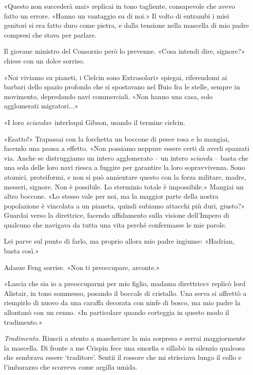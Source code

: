 «Questo non succederà mai» replicai in tono tagliente, consapevole che
avevo fatto un errore. «Hanno un vantaggio su di noi.» Il volto di
entrambi i miei genitori si era fatto duro come pietra, e dalla tensione
nella mascella di mio padre compresi che stava per parlare.

Il giovane ministro del Consorzio però lo prevenne. «Cosa intendi dire,
signore?» chiese con un dolce sorriso.

«Noi viviamo su pianeti, i Cielcin sono Extrasolari» spiegai,
riferendomi ai barbari dello spazio profondo che si spostavano nel Buio
fra le stelle, sempre in movimento, depredando navi commerciali. «Non
hanno una casa, solo agglomerati migratori...»

«I loro \emph{scianda}» interloquì Gibson, usando il termine cielcin.

«Esatto!» Trapassai con la forchetta un boccone di pesce rosa e lo
mangiai, facendo una pausa a effetto. «Non possiamo neppure essere certi
di averli spazzati via. Anche se distruggiamo un intero agglomerato --
un intero \emph{scianda} -- basta che una sola delle loro navi riesca a
fuggire per garantire la loro sopravvivenza. Sono atomici, proteiformi,
e non si può annientare questo con la forza militare, madre, messeri,
signore. Non è possibile. Lo sterminio totale è impossibile.» Mangiai un
altro boccone. «Lo stesso vale per noi, ma la maggior parte della nostra
popolazione è vincolata a un pianeta, quindi subiamo attacchi più duri,
giusto?» Guardai verso la direttrice, facendo affidamento sulla visione
dell'Impero di qualcuno che navigava da tutta una vita perché
confermasse le mie parole.

Lei parve sul punto di farlo, ma proprio allora mio padre ingiunse:
«Hadrian, basta così.»

Adaeze Feng sorrise. «Non ti preoccupare, arconte.»

«Lascia che sia io a preoccuparmi per mio figlio, madama direttrice»
replicò lord Alistair, in tono sommesso, posando il boccale di
cristallo. Una serva si affrettò a riempirlo di nuovo da una caraffa
decorata con ninfe di bosco, ma mio padre la allontanò con un cenno. «In
particolare quando corteggia in questo modo il tradimento.»

\emph{Tradimento}. Riuscii a stento a mascherare la mia sorpresa e
serrai maggiormente la mascella. Di fronte a me Crispin fece una smorfia
e sillabò in silenzio qualcosa che sembrava essere `traditore'. Sentii
il rossore che mi strisciava lungo il collo e l'imbarazzo che scorreva
come argilla umida.


